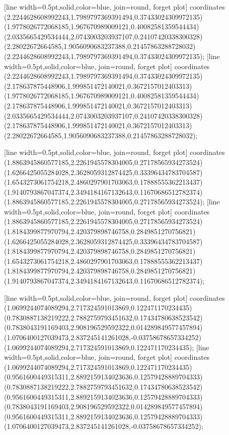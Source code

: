 [line width=0.5pt,solid,color=blue, join=round, forget plot] coordinates {(2.2244628608992243,1.7989797369391494,0.37433024309972135) (1.9778026772068185,1.967670989009121,0.40082581359544434) (2.0335665429534444,2.0743003203937107,0.24107420338300328) (2.28022672664585,1.9056090683237388,0.21457863288728032) (2.2244628608992243,1.7989797369391494,0.37433024309972135)};
[line width=0.5pt,solid,color=blue, join=round, forget plot] coordinates {(2.2244628608992243,1.7989797369391494,0.37433024309972135) (2.178637875448906,1.999851472140021,0.3672157012403313) (1.9778026772068185,1.967670989009121,0.40082581359544434) (2.178637875448906,1.999851472140021,0.3672157012403313) (2.0335665429534444,2.0743003203937107,0.24107420338300328) (2.178637875448906,1.999851472140021,0.3672157012403313) (2.28022672664585,1.9056090683237388,0.21457863288728032)};

[line width=0.5pt,solid,color=blue, join=round, forget plot] coordinates {(1.8863945860577185,2.2261945578304005,0.27178565934273524) (1.6266425055284028,2.3628059312874425,0.33396434783704587) (1.6543273061754218,2.4860297901703063,0.17888555362213437) (1.9140793867047374,2.3494184167132643,0.11670686512782374) (1.8863945860577185,2.2261945578304005,0.27178565934273524)};
[line width=0.5pt,solid,color=blue, join=round, forget plot] coordinates {(1.8863945860577185,2.2261945578304005,0.27178565934273524) (1.8184399877970794,2.420379898746758,0.2849851270756821) (1.6266425055284028,2.3628059312874425,0.33396434783704587) (1.8184399877970794,2.420379898746758,0.2849851270756821) (1.6543273061754218,2.4860297901703063,0.17888555362213437) (1.8184399877970794,2.420379898746758,0.2849851270756821) (1.9140793867047374,2.3494184167132643,0.11670686512782374)};

[line width=0.5pt,solid,color=blue, join=round, forget plot] coordinates {(1.0699244074089294,2.717324591013869,0.122471170234435) (0.7830887138219222,2.7882759793451632,0.17434780638523542) (0.7838043191169403,2.908196529592322,0.014289849577457894) (1.0706400127039473,2.837245141261028,-0.03758678657334252) (1.0699244074089294,2.717324591013869,0.122471170234435)};
[line width=0.5pt,solid,color=blue, join=round, forget plot] coordinates {(1.0699244074089294,2.717324591013869,0.122471170234435) (0.9561600449315311,2.8892159134023636,0.12579428889704333) (0.7830887138219222,2.7882759793451632,0.17434780638523542) (0.9561600449315311,2.8892159134023636,0.12579428889704333) (0.7838043191169403,2.908196529592322,0.014289849577457894) (0.9561600449315311,2.8892159134023636,0.12579428889704333) (1.0706400127039473,2.837245141261028,-0.03758678657334252)};

